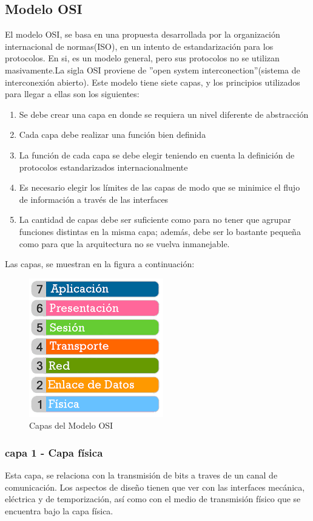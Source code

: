 \subsection{Modelo OSI}
El modelo OSI, se basa en una propuesta desarrollada por la organización internacional de normas(ISO), en un intento de estandarización para los protocolos. En si, es un modelo general, pero sus protocolos no se utilizan masivamente.La sigla OSI proviene de ''open system interconection''(sistema de interconexión abierto). Este modelo tiene siete capas, y los principios utilizados para llegar a ellas son los siguientes:
\begin{enumerate}
	\item Se debe crear una capa en donde se requiera un nivel diferente de abstracción 
	\item Cada capa debe realizar una función bien definida 
	\item La función de cada capa se debe elegir teniendo en cuenta la definición de protocolos estandarizados
	internacionalmente
	\item Es necesario elegir los límites de las capas de modo que se minimice el flujo de información a través de las interfaces 
	\item La cantidad de capas debe ser suficiente como para no tener que agrupar funciones distintas en
	la misma capa; además, debe ser lo bastante pequeña como para que la arquitectura no se vuelva
	inmanejable. 
\end{enumerate} 
Las capas, se muestran en la figura a continuación:%
\vspace{-2mm}  
\begin{figure}[ht]
	\centering
	\includegraphics[scale=0.5]{modelosi} 
	\caption{Capas del Modelo OSI}
	\label{fig:mod_osi}
\end{figure}  


\subsubsection{capa 1 - Capa física} 
Esta capa, se relaciona con la transmisión de bits a traves de un canal de comunicación. Los aspectos de diseño tienen que ver con las interfaces mecánica, eléctrica y de temporización, así como con el medio de transmisión físico que se encuentra bajo la capa física.


